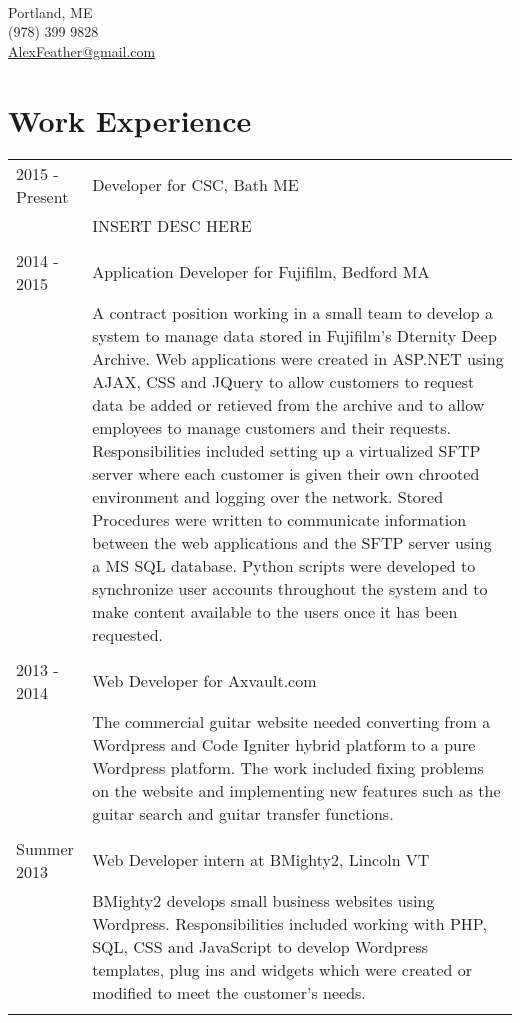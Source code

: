 \documentclass[10pt]{article}
\begin{document}
\pagestyle{empty}
\selectfont

{\\
Portland, ME\\(978) 399 9828\\\href{mailto:alexfeather77@gmail.com}{AlexFeather@gmail.com}\\}

\section*{\selectfont Work Experience}
\begin{tabular}{p{2.1cm}|p{14.9cm}}
	2015 - Present & Developer for CSC, Bath ME\\&\footnotesize{INSERT DESC HERE}\\\multicolumn{2}{c}{} \\
	2014 - 2015 & Application Developer for Fujifilm, Bedford MA\\&\footnotesize{A contract position working in a small team to develop a system to manage data stored in Fujifilm’s Dternity Deep Archive. Web applications were created in ASP.NET using AJAX, CSS and JQuery to allow customers to request data be added or retieved from the archive and to allow employees to manage customers and their requests. Responsibilities included setting up a virtualized SFTP server where each customer is given their own chrooted environment and logging over the network. Stored Procedures were written to communicate information between the web applications and the SFTP server using a MS SQL database. Python scripts were developed to synchronize user accounts throughout the system and to make content available to the users once it has been requested.}\\\multicolumn{2}{c}{} \\
	2013 - 2014 & Web Developer for Axvault.com\\&\footnotesize{The commercial guitar website needed converting from a Wordpress and Code Igniter hybrid platform to a pure Wordpress platform. The work included fixing problems on the website and implementing new features such as the guitar search and guitar transfer functions.}\\\multicolumn{2}{c}{} \\
	Summer 2013 & Web Developer intern at BMighty2, Lincoln VT\\&\footnotesize{BMighty2 develops small business websites using Wordpress. Responsibilities included working with PHP, SQL, CSS and JavaScript to develop Wordpress templates, plug ins and widgets which were created or modified to meet the customer's needs.}\\\multicolumn{2}{c}{} \\
\end{tabular}
\end{document}
